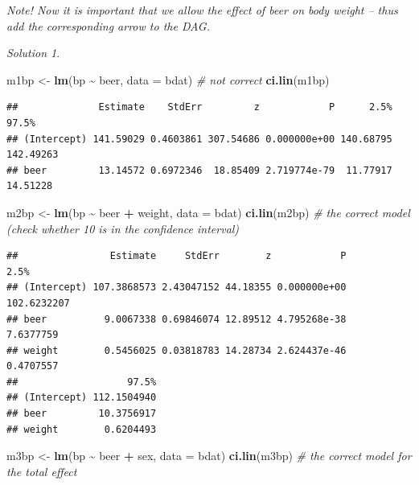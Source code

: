 \documentclass[
]{book}
\newenvironment{Shaded}{\begin{snugshade}}{\end{snugshade}}
\newcommand{\AttributeTok}[1]{\textcolor[rgb]{0.13,0.29,0.53}{#1}}
\newcommand{\CommentTok}[1]{\textcolor[rgb]{0.56,0.35,0.01}{\textit{#1}}}
\newcommand{\FunctionTok}[1]{\textcolor[rgb]{0.13,0.29,0.53}{\textbf{#1}}}
\newcommand{\NormalTok}[1]{#1}
\newcommand{\OtherTok}[1]{\textcolor[rgb]{0.56,0.35,0.01}{#1}}
\newcommand{\SpecialCharTok}[1]{\textcolor[rgb]{0.81,0.36,0.00}{\textbf{#1}}}
\theoremstyle{definition}
\theoremstyle{definition}
\theoremstyle{definition}
\theoremstyle{definition}
\theoremstyle{remark}
\newtheorem*{solution}{Solution}
\begin{document}
\emph{Note! Now it is important that we allow the effect of beer on body weight -- thus add the corresponding arrow to the DAG.}

\begin{solution}
\leavevmode

\begin{Shaded}
\begin{Highlighting}[]
\NormalTok{m1bp }\OtherTok{\textless{}{-}} \FunctionTok{lm}\NormalTok{(bp }\SpecialCharTok{\textasciitilde{}}\NormalTok{ beer, }\AttributeTok{data =}\NormalTok{ bdat) }\CommentTok{\# not correct }
\FunctionTok{ci.lin}\NormalTok{(m1bp)}
\end{Highlighting}
\end{Shaded}

\begin{verbatim}
##              Estimate    StdErr         z            P      2.5%     97.5%
## (Intercept) 141.59029 0.4603861 307.54686 0.000000e+00 140.68795 142.49263
## beer         13.14572 0.6972346  18.85409 2.719774e-79  11.77917  14.51228
\end{verbatim}

\begin{Shaded}
\begin{Highlighting}[]
\NormalTok{m2bp }\OtherTok{\textless{}{-}} \FunctionTok{lm}\NormalTok{(bp }\SpecialCharTok{\textasciitilde{}}\NormalTok{ beer }\SpecialCharTok{+}\NormalTok{ weight, }\AttributeTok{data =}\NormalTok{ bdat) }
\FunctionTok{ci.lin}\NormalTok{(m2bp) }\CommentTok{\# the correct model (check whether 10 is in the confidence interval) }
\end{Highlighting}
\end{Shaded}

\begin{verbatim}
##                Estimate     StdErr        z            P        2.5%
## (Intercept) 107.3868573 2.43047152 44.18355 0.000000e+00 102.6232207
## beer          9.0067338 0.69846074 12.89512 4.795268e-38   7.6377759
## weight        0.5456025 0.03818783 14.28734 2.624437e-46   0.4707557
##                   97.5%
## (Intercept) 112.1504940
## beer         10.3756917
## weight        0.6204493
\end{verbatim}

\begin{Shaded}
\begin{Highlighting}[]
\NormalTok{m3bp }\OtherTok{\textless{}{-}} \FunctionTok{lm}\NormalTok{(bp }\SpecialCharTok{\textasciitilde{}}\NormalTok{ beer }\SpecialCharTok{+}\NormalTok{ sex, }\AttributeTok{data =}\NormalTok{ bdat) }
\FunctionTok{ci.lin}\NormalTok{(m3bp) }\CommentTok{\# the correct model for the total effect }
\end{Highlighting}
\end{Shaded}


\end{solution}
\end{document}
